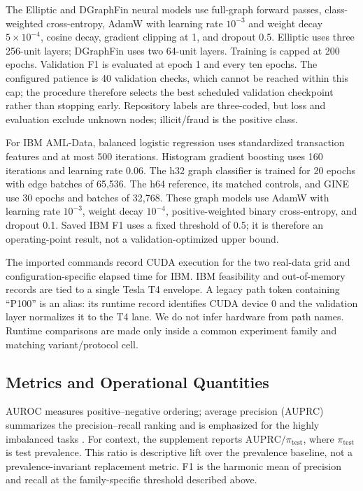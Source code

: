 The Elliptic and DGraphFin neural models use full-graph forward passes, class-weighted cross-entropy, AdamW with learning rate $10^{-3}$ and weight decay $5\times10^{-4}$, cosine decay, gradient clipping at 1, and dropout 0.5. Elliptic uses three 256-unit layers; DGraphFin uses two 64-unit layers. Training is capped at 200 epochs. Validation F1 is evaluated at epoch 1 and every ten epochs. The configured patience is 40 validation checks, which cannot be reached within this cap; the procedure therefore selects the best scheduled validation checkpoint rather than stopping early. Repository labels are three-coded, but loss and evaluation exclude unknown nodes; illicit/fraud is the positive class.

For IBM AML-Data, balanced logistic regression uses standardized transaction features and at most 500 iterations. Histogram gradient boosting uses 160 iterations and learning rate 0.06. The h32 graph classifier is trained for 20 epochs with edge batches of 65,536. The h64 reference, its matched controls, and GINE use 30 epochs and batches of 32,768. These graph models use AdamW with learning rate $10^{-3}$, weight decay $10^{-4}$, positive-weighted binary cross-entropy, and dropout 0.1. Saved IBM F1 uses a fixed threshold of 0.5; it is therefore an operating-point result, not a validation-optimized upper bound.

The imported commands record CUDA execution for the two real-data grid and configuration-specific elapsed time for IBM. IBM feasibility and out-of-memory records are tied to a single Tesla T4 envelope. A legacy path token containing ``P100'' is an alias: its runtime record identifies CUDA device 0 and the validation layer normalizes it to the T4 lane. We do not infer hardware from path names. Runtime comparisons are made only inside a common experiment family and matching variant/protocol cell.

\subsection{Metrics and Operational Quantities}

AUROC measures positive--negative ordering; average precision (AUPRC) summarizes the precision--recall ranking and is emphasized for the highly imbalanced tasks \cite{saito2015pr}. For context, the supplement reports $\mathrm{AUPRC}/\pi_{\mathrm{test}}$, where $\pi_{\mathrm{test}}$ is test prevalence. This ratio is descriptive lift over the prevalence baseline, not a prevalence-invariant replacement metric. F1 is the harmonic mean of precision and recall at the family-specific threshold described above.

